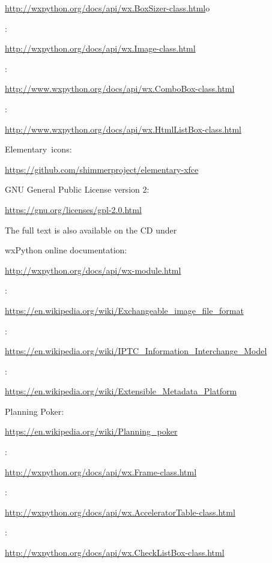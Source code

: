 \documentclass[12pt,a4paper,naustrian,english,oneside,openright,DIV=12,BCOR=1cm]{scrbook}
\begin{document}
\begin{thebibliography}{999}
	\url{http://wxpython.org/docs/api/wx.BoxSizer-class.html}o

	 :

	\url{http://wxpython.org/docs/api/wx.Image-class.html}

	 :
	
	\url{http://www.wxpython.org/docs/api/wx.ComboBox-class.html}
	
	 :
	
	\url{http://www.wxpython.org/docs/api/wx.HtmlListBox-class.html}

	 Elementary~icons:

	\url{https://github.com/shimmerproject/elementary-xfce}

	 GNU General Public License version 2:
	
	\url{https://gnu.org/licenses/gpl-2.0.html}
	
	
	The full text is also available on the CD under 
	
	 wxPython online documentation:
	
	\url{http://wxpython.org/docs/api/wx-module.html}
	
	 :
	
	\url{https://en.wikipedia.org/wiki/Exchangeable_image_file_format}
	
	 :
	
	\url{https://en.wikipedia.org/wiki/IPTC_Information_Interchange_Model}
	
	 :
	
	\url{https://en.wikipedia.org/wiki/Extensible_Metadata_Platform}
	
	 Planning Poker:
	
	\url{https://en.wikipedia.org/wiki/Planning_poker}
	
	 :
	
	\url{http://wxpython.org/docs/api/wx.Frame-class.html}
	
	 :
	
	\url{http://wxpython.org/docs/api/wx.AcceleratorTable-class.html}
	
	 :
	
	\url{http://wxpython.org/docs/api/wx.CheckListBox-class.html}
	

\end{thebibliography}
\end{document}
